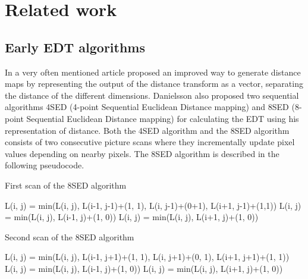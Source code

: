 \chapter{Related work}\label{cha:relatedwork}
\section{Early EDT algorithms}\label{earlyedt}
In a very often mentioned article \citet{Danielsson} proposed an improved way to generate distance maps by representing the output of the distance transform as a vector, separating the distance of the different dimensions. Danielsson also proposed two sequential algorithms 4SED (4-point Sequential Euclidean Distance mapping) and 8SED (8-point Sequential Euclidean Distance mapping) for calculating the EDT using his representation of distance. Both the 4SED algorithm and the 8SED algorithm consists of two consecutive picture scans where they incrementally update pixel values depending on nearby pixels. The 8SED algorithm is described in the following pseudocode.\vspace{\baselineskip}\newline
\begin{algorithm}[H]
\caption{First scan of the 8SED algorithm}
\begin{algorithmic}
		\State L(i, j) = min(L(i, j), L(i-1, j-1)+(1, 1), L(i, j-1)+(0+1), L(i+1, j-1)+(1,1))\;
	\EndFor
		\State L(i, j) = min(L(i, j), L(i-1, j)+(1, 0))\;
	\EndFor
		\State L(i, j) = min(L(i, j), L(i+1, j)+(1, 0))\;
	\EndFor
\EndFor
\end{algorithmic}
\end{algorithm}
\vspace{\baselineskip}
\begin{algorithm}
\caption{Second scan of the 8SED algorithm}
\begin{algorithmic}[H]
		\State L(i, j) = min(L(i, j), L(i-1, j+1)+(1, 1), L(i, j+1)+(0, 1), L(i+1, j+1)+(1, 1))\;
	\EndFor
		\State L(i, j) = min(L(i, j), L(i-1, j)+(1, 0))\;
	\EndFor
		\State L(i, j) = min(L(i, j), L(i+1, j)+(1, 0))\;
	\EndFor
\EndFor
\end{algorithmic}
\end{algorithm}\vspace{\baselineskip}


